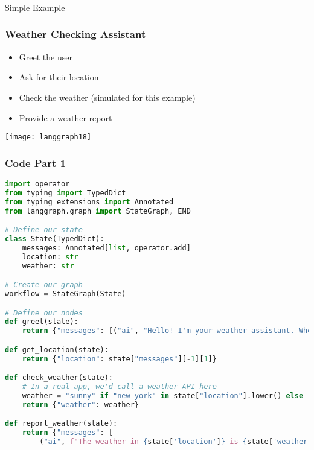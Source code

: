 \begin{frame}[fragile]\frametitle{}
\begin{center}
{\Large Simple Example}
\end{center}
\end{frame}

\begin{frame}[fragile]\frametitle{Weather Checking Assistant}


      \begin{itemize}
        \item Greet the user
        \item Ask for their location
        \item Check the weather (simulated for this example)
        \item Provide a weather report
      \end{itemize}


\begin{center}
\texttt{[image: langgraph18]}
\end{center}

  
  

\end{frame}

\begin{frame}[fragile]\frametitle{Code Part 1}
      \begin{lstlisting}[language=Python, basicstyle=\tiny]
import operator
from typing import TypedDict
from typing_extensions import Annotated
from langgraph.graph import StateGraph, END

# Define our state
class State(TypedDict):
    messages: Annotated[list, operator.add]
    location: str
    weather: str

# Create our graph
workflow = StateGraph(State)

# Define our nodes
def greet(state):
    return {"messages": [("ai", "Hello! I'm your weather assistant. Where are you located?")]}

def get_location(state):
    return {"location": state["messages"][-1][1]}

def check_weather(state):
    # In a real app, we'd call a weather API here
    weather = "sunny" if "new york" in state["location"].lower() else "rainy"
    return {"weather": weather}

def report_weather(state):
    return {"messages": [
        ("ai", f"The weather in {state['location']} is {state['weather']}. Can I help you with anything else?")]}
      \end{lstlisting}
\end{frame}



